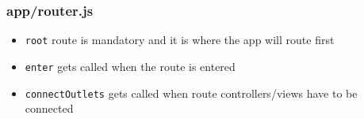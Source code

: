 \documentclass[compress]{beamer}
\begin{document}
\begin{frame}

\frametitle{app/router.js}

\begin{itemize}[<+->]
  \item \texttt{root} route is mandatory and it is where the app will route first
  \item \texttt{enter} gets called when the route is entered
  \item \texttt{connectOutlets} gets called when route controllers/views have to be connected
\end{itemize}


\inputminted[fontsize=\tiny,gobble=2,linenos=true,firstline=6,lastline=29]{javascript}{code/js/app/router.js}

\end{frame}
\end{document}
